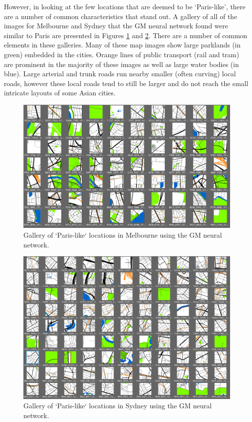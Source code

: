 \documentclass[sageh,times]{sagej}
\begin{document}
However, in looking at the few locations that are deemed to be `Paris-like', there are a number of common characteristics that stand out. A gallery of all of the images for Melbourne and Sydney that the GM neural network found were similar to Paris are presented in Figures \ref{fig:gm_mel_gallery} and \ref{fig:gm_syd_gallery}. There are a number of common elements in these galleries. Many of these map images show large parklands (in green) embedded in the cities. Orange lines of public transport (rail and tram) are prominent in the majority of these images as well as large water bodies (in blue). Large arterial and trunk roads run nearby smaller (often curving) local roads, however these local roads tend to still be larger and do not reach the small intricate layouts of some Asian cities.

 \begin{figure}[!htbp]
 \centering    
 \includegraphics[scale=0.50]{Images/MelbourneLikeParis/Melbourne_maps_gallery.png} 
 \caption{Gallery of `Paris-like` locations in Melbourne using the GM neural network.}    
  \label{fig:gm_mel_gallery}  
 \end{figure} 

\begin{figure}[!htbp]
\centering    
\includegraphics[scale=0.50]{Images/SydneyLikeParis/Sydney_maps_gallery.png} 
\caption{Gallery of `Paris-like` locations in Sydney using the GM neural network.}    
 \label{fig:gm_syd_gallery}  
\end{figure} 
\end{document}
